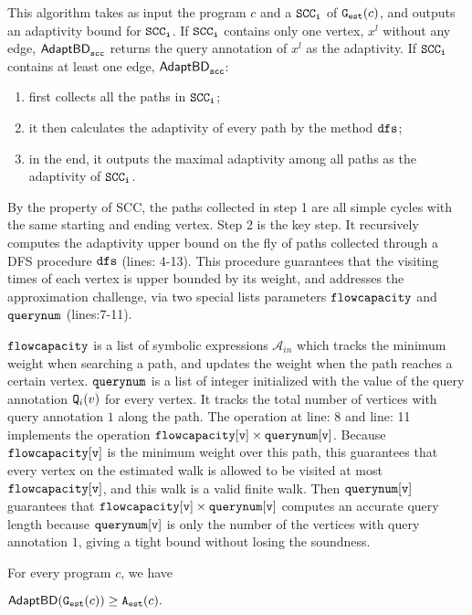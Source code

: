 This algorithm takes as input the program $c$ and a $\mathtt{SCC_i}$ of
$\mathtt{{G_{est}}}(c)$, and outputs an adaptivity bound for $\mathtt{SCC_i}$. 
If $\mathtt{SCC_i}$ contains only one vertex, $x^l$ without any edge, $\mathtt{\mathsf{AdaptBD}_{scc}}$ returns the query annotation of $x^l$ as the adaptivity.
If $\mathtt{SCC_i}$ contains at least one edge, 
$\mathtt{\mathsf{AdaptBD}_{scc}}$:
\begin{enumerate}
\item first collects all the paths in $\mathtt{SCC_i}$; 
\item it then calculates the adaptivity of every path by the method $\mathtt{dfs}$; 
\item in the end, it outputs the maximal adaptivity among all paths as the adaptivity of $\mathtt{SCC_i}$.
\end{enumerate}
By the property of SCC, the paths collected in step 1 are all simple cycles with the same starting and ending vertex. 
Step 2 is the key step. It recursively computes the adaptivity upper bound on the fly of paths collected through a DFS procedure $\mathtt{dfs}$ (lines: 4-13). This procedure guarantees that the visiting times of each vertex is upper bounded by its weight, and addresses the approximation challenge,
via two special lists parameters $\mathtt{flowcapacity}$ and $\mathtt{querynum}$ (lines:7-11).
 
 
$\mathtt{flowcapacity}$ is a list of symbolic expressions $\mathcal{A}_{in}$ which tracks the minimum weight
when searching a path,
and updates the weight when the path reaches a certain vertex.
%
$\mathtt{querynum}$ is a list of integer
initialized with the value of the query annotation $\mathtt{Q}_i(v)$ for every vertex. 
It tracks the total number of vertices with query annotation $1$
along the path.
%
The operation
at line: 8 and line: 11 implements the operation  $\mathtt{flowcapacity[v] \times querynum[v]}$.
Because $\mathtt{flowcapacity[v]}$ is the minimum weight over this path,
this guarantees that every vertex on the estimated walk is allowed to be visited at most $\mathtt{flowcapacity[v]}$, and this walk is a valid finite walk.
Then $\mathtt{querynum[v]}$ guarantees that $\mathtt{flowcapacity[v] \times querynum[v]}$ computes an accurate query length
because $\mathtt{querynum[v]}$ is only the number of the vertices with query annotation $1$,
giving a tight bound without losing the soundness.

\begin{thm}
    \label{thm:adaptalg_soundness}
    For every program $c$, we have
\begin{center}
$
\mathsf{AdaptBD}(\mathtt{{G_{est}}}({c})) \geq {\ensuremath{\mathtt{A_{est}}}}(c).
$
\end{center}
\end{thm}


